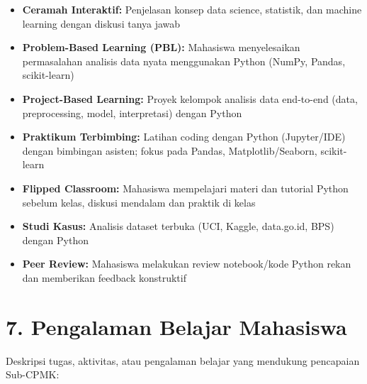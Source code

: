 \documentclass[12pt,a4paper]{article}
\begin{document}
\begin{itemize}[leftmargin=*]
  \item \textbf{Ceramah Interaktif:} Penjelasan konsep data science, statistik, dan machine learning dengan diskusi tanya jawab
  \item \textbf{Problem-Based Learning (PBL):} Mahasiswa menyelesaikan permasalahan analisis data nyata menggunakan Python (NumPy, Pandas, scikit-learn)
  \item \textbf{Project-Based Learning:} Proyek kelompok analisis data end-to-end (data, preprocessing, model, interpretasi) dengan Python
  \item \textbf{Praktikum Terbimbing:} Latihan coding dengan Python (Jupyter/IDE) dengan bimbingan asisten; fokus pada Pandas, Matplotlib/Seaborn, scikit-learn
  \item \textbf{Flipped Classroom:} Mahasiswa mempelajari materi dan tutorial Python sebelum kelas, diskusi mendalam dan praktik di kelas
  \item \textbf{Studi Kasus:} Analisis dataset terbuka (UCI, Kaggle, data.go.id, BPS) dengan Python
  \item \textbf{Peer Review:} Mahasiswa melakukan review notebook/kode Python rekan dan memberikan feedback konstruktif
\end{itemize}

\vspace{0.5cm}

\section*{7. Pengalaman Belajar Mahasiswa}

Deskripsi tugas, aktivitas, atau pengalaman belajar yang mendukung pencapaian Sub-CPMK:
\end{document}
